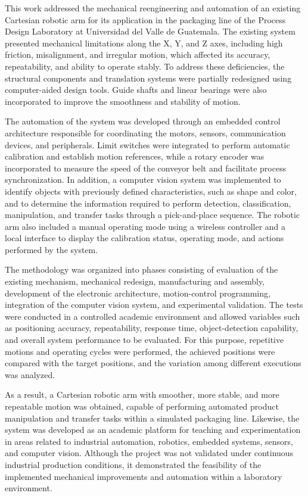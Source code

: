 This work addressed the mechanical reengineering and automation of an existing Cartesian robotic arm for its application in the packaging line of the Process Design Laboratory at Universidad del Valle de Guatemala. The existing system presented mechanical limitations along the X, Y, and Z axes, including high friction, misalignment, and irregular motion, which affected its accuracy, repeatability, and ability to operate stably. To address these deficiencies, the structural components and translation systems were partially redesigned using computer-aided design tools. Guide shafts and linear bearings were also incorporated to improve the smoothness and stability of motion.

The automation of the system was developed through an embedded control architecture responsible for coordinating the motors, sensors, communication devices, and peripherals. Limit switches were integrated to perform automatic calibration and establish motion references, while a rotary encoder was incorporated to measure the speed of the conveyor belt and facilitate process synchronization. In addition, a computer vision system was implemented to identify objects with previously defined characteristics, such as shape and color, and to determine the information required to perform detection, classification, manipulation, and transfer tasks through a pick-and-place sequence. The robotic arm also included a manual operating mode using a wireless controller and a local interface to display the calibration status, operating mode, and actions performed by the system.

The methodology was organized into phases consisting of evaluation of the existing mechanism, mechanical redesign, manufacturing and assembly, development of the electronic architecture, motion-control programming, integration of the computer vision system, and experimental validation. The tests were conducted in a controlled academic environment and allowed variables such as positioning accuracy, repeatability, response time, object-detection capability, and overall system performance to be evaluated. For this purpose, repetitive motions and operating cycles were performed, the achieved positions were compared with the target positions, and the variation among different executions was analyzed.

As a result, a Cartesian robotic arm with smoother, more stable, and more repeatable motion was obtained, capable of performing automated product manipulation and transfer tasks within a simulated packaging line. Likewise, the system was developed as an academic platform for teaching and experimentation in areas related to industrial automation, robotics, embedded systems, sensors, and computer vision. Although the project was not validated under continuous industrial production conditions, it demonstrated the feasibility of the implemented mechanical improvements and automation within a laboratory environment.